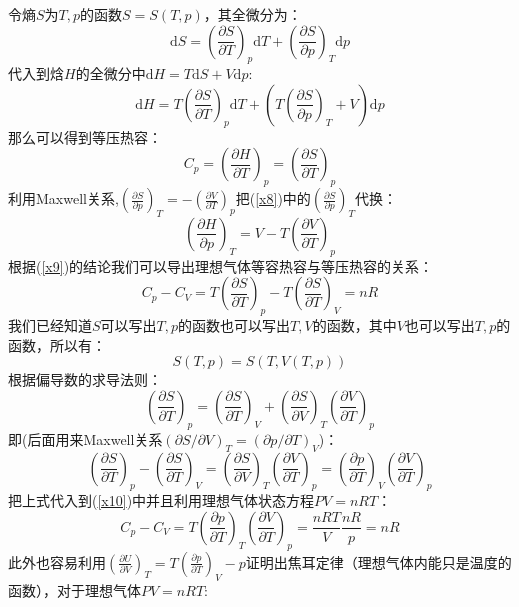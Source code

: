\documentclass[12pt]{article}
\begin{document}
令熵$S$为$T,p$的函数$S=S(T,p)$，其全微分为：
\begin{equation}
	\mathrm{d}S=(\frac{\partial S}{\partial T})_p\mathrm{d}T+(\frac{\partial S}{\partial p})_T\mathrm{d}p
\end{equation}
代入到焓$H$的全微分中$\mathrm{d}H=T\mathrm{d}S+V\mathrm{d}p$:
\begin{equation}
	\mathrm{d}H=T(\frac{\partial S}{\partial T})_p\mathrm{d}T+(T(\frac{\partial S}{\partial p})_T+V)\mathrm{d}p
	\label{x8}
\end{equation}
那么可以得到等压热容：
\begin{equation}
	C_p=(\frac{\partial H}{\partial T})_p=(\frac{\partial S}{\partial T})_p
\end{equation}
利用Maxwell关系,$(\frac{\partial S}{\partial p})_T=-(\frac{\partial V}{\partial T})_p$把(\ref{x8})中的$(\frac{\partial S}{\partial p})_T$代换：
\begin{equation}
	{{(\frac{\partial H}{\partial p})}_{T}}=V-T{{(\frac{\partial V}{\partial T})}_{p}} 
\end{equation}
根据(\ref{x9})的结论我们可以导出理想气体等容热容与等压热容的关系：
\begin{equation}
	C_p-C_V=T(\frac{\partial S}{\partial T})_p-T(\frac{\partial S}{\partial T})_V=nR
	\label{x10}
\end{equation}
我们已经知道$S$可以写出$T,p$的函数也可以写出$T,V$的函数，其中$V$也可以写出$T,p$的函数，所以有：
\begin{equation}
	S(T,p)=S(T,V(T,p))
\end{equation}
根据偏导数的求导法则：
\begin{equation}
	(\frac{\partial S}{\partial T})_p=(\frac{\partial S}{\partial T})_V+(\frac{\partial S}{\partial V})_T(\frac{\partial V}{\partial T})_p
\end{equation}
即(后面用来Maxwell关系$(\partial S/\partial V)_T=(\partial p/\partial T)_V$)：
\begin{equation}
	(\frac{\partial S}{\partial T})_p-(\frac{\partial S}{\partial T})_V=(\frac{\partial S}{\partial V})_T(\frac{\partial V}{\partial T})_p=(\frac{\partial p}{\partial T})_V(\frac{\partial V}{\partial T})_p
\end{equation}
把上式代入到(\ref{x10})中并且利用理想气体状态方程$PV=nRT$：
\begin{equation}
	C_p-C_V=T(\frac{\partial p}{\partial T})_T(\frac{\partial V}{\partial T})_p= \frac{nRT}{V}\frac{nR}{p}=nR
\end{equation}
此外也容易利用${{(\frac{\partial U}{\partial V})}_{T}}=T{{(\frac{\partial p}{\partial T})}_{V}}-p$证明出焦耳定律（理想气体内能只是温度的函数），对于理想气体$PV=nRT$:
\end{document}
